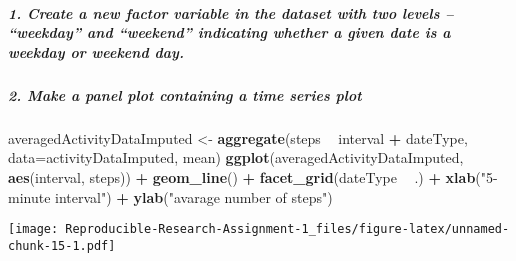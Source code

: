 \documentclass[]{article}
\newenvironment{Shaded}{\begin{snugshade}}{\end{snugshade}}
\newcommand{\DataTypeTok}[1]{\textcolor[rgb]{0.13,0.29,0.53}{#1}}
\newcommand{\DecValTok}[1]{\textcolor[rgb]{0.00,0.00,0.81}{#1}}
\newcommand{\KeywordTok}[1]{\textcolor[rgb]{0.13,0.29,0.53}{\textbf{#1}}}
\newcommand{\NormalTok}[1]{#1}
\newcommand{\OperatorTok}[1]{\textcolor[rgb]{0.81,0.36,0.00}{\textbf{#1}}}
\newcommand{\StringTok}[1]{\textcolor[rgb]{0.31,0.60,0.02}{#1}}
\let\oldsubparagraph\subparagraph
\renewcommand{\subparagraph}[1]{\oldsubparagraph{#1}\mbox{}}
\begin{document}
\hypertarget{create-a-new-factor-variable-in-the-dataset-with-two-levels-weekday-and-weekend-indicating-whether-a-given-date-is-a-weekday-or-weekend-day.}{%
\subparagraph{1. Create a new factor variable in the dataset with two
levels -- ``weekday'' and ``weekend'' indicating whether a given date is
a weekday or weekend
day.}\label{create-a-new-factor-variable-in-the-dataset-with-two-levels-weekday-and-weekend-indicating-whether-a-given-date-is-a-weekday-or-weekend-day.}}

\begin{Shaded}
\end{Shaded}

\hypertarget{make-a-panel-plot-containing-a-time-series-plot}{%
\subparagraph{2. Make a panel plot containing a time series
plot}\label{make-a-panel-plot-containing-a-time-series-plot}}

\begin{Shaded}
\begin{Highlighting}[]
\NormalTok{averagedActivityDataImputed <-}\StringTok{ }\KeywordTok{aggregate}\NormalTok{(steps }\OperatorTok{~}\StringTok{ }\NormalTok{interval }\OperatorTok{+}\StringTok{ }\NormalTok{dateType, }\DataTypeTok{data=}\NormalTok{activityDataImputed, mean)}
\KeywordTok{ggplot}\NormalTok{(averagedActivityDataImputed, }\KeywordTok{aes}\NormalTok{(interval, steps)) }\OperatorTok{+}\StringTok{ }
\StringTok{    }\KeywordTok{geom_line}\NormalTok{() }\OperatorTok{+}\StringTok{ }
\StringTok{    }\KeywordTok{facet_grid}\NormalTok{(dateType }\OperatorTok{~}\StringTok{ }\NormalTok{.) }\OperatorTok{+}
\StringTok{    }\KeywordTok{xlab}\NormalTok{(}\StringTok{"5-minute interval"}\NormalTok{) }\OperatorTok{+}\StringTok{ }
\StringTok{    }\KeywordTok{ylab}\NormalTok{(}\StringTok{"avarage number of steps"}\NormalTok{)}
\end{Highlighting}
\end{Shaded}

\texttt{[image: Reproducible-Research-Assignment-1\_files/figure-latex/unnamed-chunk-15-1.pdf]}
\end{document}
